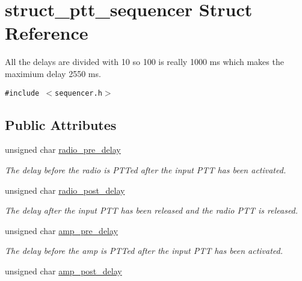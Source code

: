 \hypertarget{structstruct__ptt__sequencer}{
\section{struct\_\-ptt\_\-sequencer Struct Reference}
\label{structstruct__ptt__sequencer}
}
All the delays are divided with 10 so 100 is really 1000 ms which makes the maximium delay 2550 ms.  


{\tt \#include $<$sequencer.h$>$}

\subsection*{Public Attributes}
\begin{CompactItemize}
\item 
\hypertarget{structstruct__ptt__sequencer_702e757af8539ea1b50591e2cc00b799}{
unsigned char \hyperlink{structstruct__ptt__sequencer_702e757af8539ea1b50591e2cc00b799}{radio\_\-pre\_\-delay}}
\label{structstruct__ptt__sequencer_702e757af8539ea1b50591e2cc00b799}

\begin{CompactList}\small\item\em The delay before the radio is PTTed after the input PTT has been activated. \item\end{CompactList}\item 
\hypertarget{structstruct__ptt__sequencer_b4f538805dcedc5be55360eed1de886b}{
unsigned char \hyperlink{structstruct__ptt__sequencer_b4f538805dcedc5be55360eed1de886b}{radio\_\-post\_\-delay}}
\label{structstruct__ptt__sequencer_b4f538805dcedc5be55360eed1de886b}

\begin{CompactList}\small\item\em The delay after the input PTT has been released and the radio PTT is released. \item\end{CompactList}\item 
\hypertarget{structstruct__ptt__sequencer_46c2c68b12d4cd52e3d7d86af46fa498}{
unsigned char \hyperlink{structstruct__ptt__sequencer_46c2c68b12d4cd52e3d7d86af46fa498}{amp\_\-pre\_\-delay}}
\label{structstruct__ptt__sequencer_46c2c68b12d4cd52e3d7d86af46fa498}

\begin{CompactList}\small\item\em The delay before the amp is PTTed after the input PTT has been activated. \item\end{CompactList}\item 
\hypertarget{structstruct__ptt__sequencer_722cda497689fc4fe50d0e6c15e6726e}{
unsigned char \hyperlink{structstruct__ptt__sequencer_722cda497689fc4fe50d0e6c15e6726e}{amp\_\-post\_\-delay}}
\label{structstruct__ptt__sequencer_722cda497689fc4fe50d0e6c15e6726e}


\end{CompactItemize}
